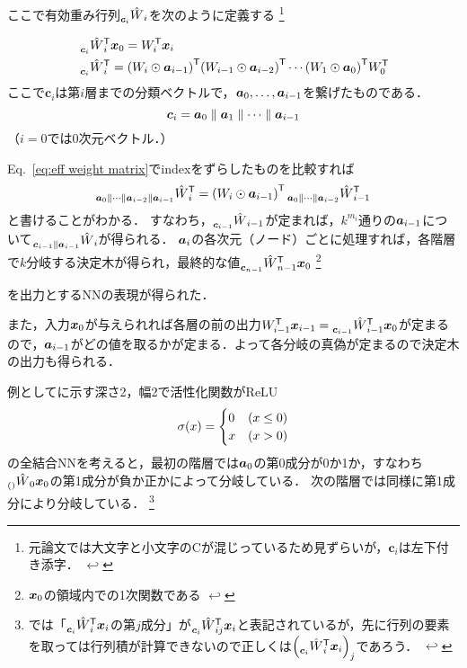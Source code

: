 \documentclass[dvipdfmx,autodetect-engine,12pt,fleqn]{jsarticle}
\newcounter{footnote-anchor}
\newcommand{\footnoteanchor}[1]{
    \hypertarget{footnote-anchor\arabic{footnote-anchor}}{}%
    \footnote{#1 \hyperlink{footnote-anchor\arabic{footnote-anchor}}{$\hookleftarrow$}}%
    \addtocounter{footnote-anchor}{1}
}
\begin{document}
\newcommand{\effweightmatrix}[2]{\prescript{}{#1}{\hat{W}}_{#2}}
\newcommand{\catindex}[1]{\bm{c}_{#1}}
ここで有効重み行列$\effweightmatrix{\catindex{i}}{i}$を次のように定義する\footnoteanchor{元論文では大文字と小文字のCが混じっているため見ずらいが，$\catindex{i}$は左下付き添字．}
\begin{equation}
\label{eq:eff weight matrix}
\begin{split}
&\effweightmatrix{\catindex{i}}{i}^\transpose \layervector{0}
    = \weightmatrixT{i}\layervector{i}\\
&\effweightmatrix{\catindex{i}}{i}^\transpose
    = \qty(\weightmatrix{i}\odot \activeindex{i-1})^\transpose
    \qty(\weightmatrix{i-1}\odot \activeindex{i-2})^\transpose
    \cdots \qty(\weightmatrix{1}\odot \activeindex{0})^\transpose \weightmatrixT{0}
\end{split}
\end{equation}
ここで$\catindex{i}$は第$i$層までの分類ベクトルで，$\bm{a}_{0},\dots,\bm{a}_{i-1}$を繋げたものである．
\[
\catindex{i}=\activeindex{0}\parallel\activeindex{1}\parallel\dots\parallel\activeindex{i-1}
\]
（$i=0$では0次元ベクトル．）

Eq.~\eqref{eq:eff weight matrix}でindexをずらしたものを比較すれば
\[
\effweightmatrix{\activeindex{0}\parallel\dots\parallel\activeindex{i-2}\parallel\activeindex{i-1}}{i}^\transpose
= \qty(\weightmatrix{i}\odot\activeindex{i-1})^\transpose \effweightmatrix{\activeindex{0}\parallel\dots\parallel\activeindex{i-2}}{i-1}^\transpose
\]
と書けることがわかる．
すなわち，$\effweightmatrix{\catindex{i-1}}{i-1}$が定まれば，$k^{m_i}$通りの$\bm{a}_{i-1}$について$\effweightmatrix{\catindex{i-1}\parallel\activeindex{i-1}}{i}$が得られる．
$\bm{a}_{i}$の各次元（ノード）ごとに処理すれば，各階層で$k$分岐する決定木が得られ，最終的な値$\effweightmatrix{\catindex{n-1}}{n-1}^\transpose \layervector{0}$\footnoteanchor{$\bm{x}_{0}$の領域内での1次関数である}を出力とするNNの表現が得られた．

また，入力$\bm{x}_{0}$が与えられれば各層の前の出力$\weightmatrixT{i-1}\layervector{i-1}=\effweightmatrix{\catindex{i-1}}{i-1}^\transpose \layervector{0}$が定まるので，$\bm{a}_{i-1}$がどの値を取るかが定まる．よって各分岐の真偽が定まるので決定木の出力も得られる．

例としてに示す深さ2，幅2で活性化関数がReLU
\[
\sigma\lparen x\rparen=\begin{cases}
0 & (x\le 0)\\
x & (x>0)
\end{cases}
\]
の全結合NNを考えると，最初の階層では$\bm{a}_{0}$の第0成分が0か1か，すなわち$\effweightmatrix{()}{0}\layervector{0}$の第1成分が負か正かによって分岐している．
次の階層では同様に第1成分により分岐している．\footnoteanchor{
では「$\effweightmatrix{\catindex{i}}{i}^\transpose\layervector{i}$の第$j$成分」が$\effweightmatrix{\catindex{i}}{ij}^\transpose\layervector{i}$と表記されているが，先に行列の要素を取っては行列積が計算できないので正しくは$\qty(\effweightmatrix{\catindex{i}}{i}^\transpose\layervector{i})_j$であろう．
}
\end{document}
